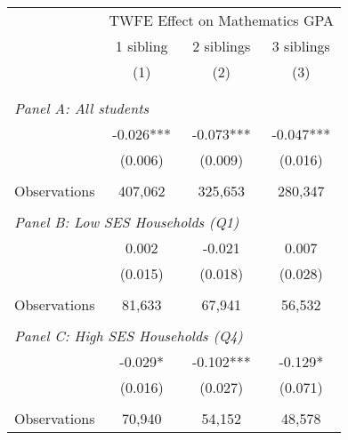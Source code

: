 \makeatletter
{}
{
\makeatother
\begin{tabular}{lccc}
\toprule
\cmidrule(lr){2-4}
& \multicolumn{3}{c}{TWFE Effect on Mathematics GPA} \\
\cmidrule(lr){2-4}
& 1 sibling & 2 siblings & 3 siblings  \\
\cmidrule(lr){2-2} \cmidrule(lr){3-3} \cmidrule(lr){4-4}
& (1) & (2) & (3)\\
\bottomrule
&  &  &  \\
&  &  &   \\
\multicolumn{4}{l}{\textit{Panel A: All students}} \\
\hspace{3mm}        &      -0.026***&      -0.073***&      -0.047***\\
                    &     (0.006)   &     (0.009)   &     (0.016)   \\
                    &               &               &               \\
\hspace{3mm}Observations&     407,062   &     325,653   &     280,347   \\
 
&  &  &   \\
\multicolumn{4}{l}{\textit{Panel B: Low SES Households (Q1)}} \\
\hspace{3mm}        &       0.002   &      -0.021   &       0.007   \\
                    &     (0.015)   &     (0.018)   &     (0.028)   \\
                    &               &               &               \\
\hspace{3mm}Observations&      81,633   &      67,941   &      56,532   \\
 
&  &  &   \\
\multicolumn{4}{l}{\textit{Panel C: High SES Households (Q4)}} \\
\hspace{3mm}        &      -0.029*  &      -0.102***&      -0.129*  \\
                    &     (0.016)   &     (0.027)   &     (0.071)   \\
                    &               &               &               \\
\hspace{3mm}Observations&      70,940   &      54,152   &      48,578   \\
 

\end{tabular}}
